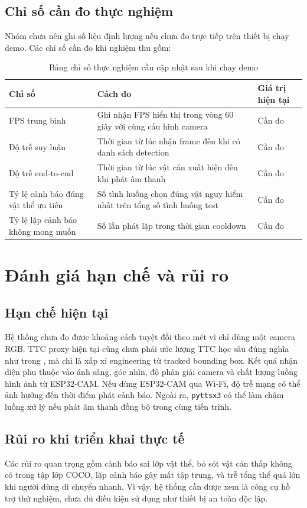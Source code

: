 \documentclass[twoside,final]{hcmut-report}
\begin{document}
\subsection{Chỉ số cần đo thực nghiệm}
Nhóm chưa nên ghi số liệu định lượng nếu chưa đo trực tiếp trên thiết bị chạy demo. Các chỉ số cần đo khi nghiệm thu gồm:
\begin{table}[H]
  \centering
  \caption{Bảng chỉ số thực nghiệm cần cập nhật sau khi chạy demo}
  \label{tab:metrics}
  \begin{tabularx}{\textwidth}{L{4.0cm}Y L{3.0cm}}
    \toprule
    \textbf{Chỉ số} & \textbf{Cách đo} & \textbf{Giá trị hiện tại} \\
    \midrule
    FPS trung bình & Ghi nhận FPS hiển thị trong vòng 60 giây với cùng cấu hình camera & Cần đo \\
    Độ trễ suy luận & Thời gian từ lúc nhận frame đến khi có danh sách detection & Cần đo \\
    Độ trễ end-to-end & Thời gian từ lúc vật cản xuất hiện đến khi phát âm thanh & Cần đo \\
    Tỷ lệ cảnh báo đúng vật thể ưu tiên & Số tình huống chọn đúng vật nguy hiểm nhất trên tổng số tình huống test & Cần đo \\
    Tỷ lệ lặp cảnh báo không mong muốn & Số lần phát lặp trong thời gian cooldown & Cần đo \\
    \bottomrule
  \end{tabularx}
\end{table}

\section{Đánh giá hạn chế và rủi ro}

\subsection{Hạn chế hiện tại}
Hệ thống chưa đo được khoảng cách tuyệt đối theo mét vì chỉ dùng một camera RGB. TTC proxy hiện tại cũng chưa phải ước lượng TTC học sâu đúng nghĩa như trong \citep{badki2021binaryttc}, mà chỉ là xấp xỉ engineering từ tracked bounding box. Kết quả nhận diện phụ thuộc vào ánh sáng, góc nhìn, độ phân giải camera và chất lượng luồng hình ảnh từ ESP32-CAM. Nếu dùng ESP32-CAM qua Wi-Fi, độ trễ mạng có thể ảnh hưởng đến thời điểm phát cảnh báo. Ngoài ra, \texttt{pyttsx3} có thể làm chậm luồng xử lý nếu phát âm thanh đồng bộ trong cùng tiến trình.

\subsection{Rủi ro khi triển khai thực tế}
Các rủi ro quan trọng gồm cảnh báo sai lớp vật thể, bỏ sót vật cản thấp không có trong tập lớp COCO, lặp cảnh báo gây mất tập trung, và trễ tổng thể quá lớn khi người dùng di chuyển nhanh. Vì vậy, hệ thống cần được xem là công cụ hỗ trợ thử nghiệm, chưa đủ điều kiện sử dụng như thiết bị an toàn độc lập.
\end{document}
